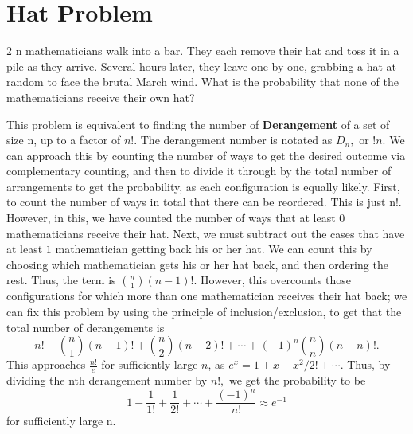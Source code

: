 \section{Hat Problem}
\begin{problem}
	2 n mathematicians walk into a bar. They each remove their hat and toss it in a pile as they arrive. Several hours later, they leave one by one, grabbing a hat at random to face the brutal March wind. What is the probability that none of the mathematicians receive their own hat?
\end{problem}
\begin{solution}
	This problem is equivalent to finding the number of \textbf{Derangement} of a set of size n, up to a factor of $n!$. The derangement number is notated as $D_n,$ or $!n.$
	\newline
	We can approach this by counting the number of ways to get the desired outcome via complementary counting, and then to divide it through by the total number of arrangements to get the probability, as each configuration is equally likely. First, to count the number of ways in total that there can be reordered. This is just n!. However, in this, we have counted the number of ways that at least $0$ mathematicians receive their hat. Next, we must subtract out the cases that have at least $1$ mathematician getting back his or her hat. We can count this by choosing which mathematician gets his or her hat back, and then ordering the rest. Thus, the term is ${n\choose1}\left(n-1\right)!.$ However, this overcounts those configurations for which more than one mathematician receives their hat back; we can fix this problem by using the principle of inclusion/exclusion, to get that the total number of derangements is \[n!-{n\choose1}\left(n-1\right)!+{n\choose2}\left(n-2\right)!+\cdots+(-1)^n{n\choose n}\left(n-n\right)!.\]
	This approaches $\frac{n!}{e}$ for sufficiently large $n$, as $e^x=1+x+x^2/2!+\cdots.$ Thus, by dividing the nth derangement number by $n!,$ we get the probability to be \[1-\frac{1}{1!}+\frac{1}{2!}+\cdots+\frac{(-1)^n}{n!}\approx e^{-1}\] for sufficiently large n.
\end{solution}
